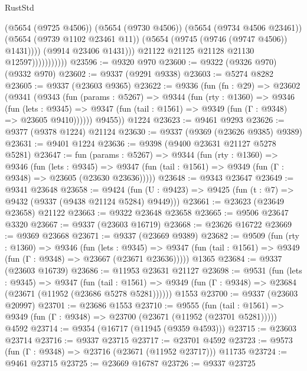 \begin{lexlean}{RustStd}
\begin{coremodule}
                                  (@5654 (@9725 @4506))
                                  (@5654 (@9730 @4506))
                                  (@5654 (@9734 @4506 @23461))
                                  (@5654 (@9739 @1102 @23461 @11))
                                  (@5654 (@9745 (@9746 (@9747 @4506)) @1431))))
                              (@9914 @23406 @1431)))
                          @21122
                          @21125
                          @21128
                          @21130
                          @12597)))))))))))
@23596 := @9320 @970
@23600 := @9322 (@9326 @970) (@9332 @970)
@23602 := @9337 (@9291 @9338)
@23603 := @5274 @8282
@23605 := @9337 (@23603 @9365)
@23622 := @9336
    (fun (fn : @29) =>
    @23602
      (@9341
        (@9343
          (fun (params : @5267) =>
          @9344
            (fun (rty : @1360) =>
            @9346
              (fun (lets : @9345) =>
              @9347 (fun (tail : @1561) => @9349 (fun (Γ : @9348) => @23605 @9410))))))
        @9455))
    @1224
@23623 := @9461 @9293
@23626 := @9377 (@9378 @1224) @21124
@23630 := @9337 (@9369 (@23626 @9385) @9389)
@23631 := @9401 @1224
@23636 := @9398 (@9400 @23631 @21127 @5278 @5281)
@23647 := fun (params : @5267) =>
  @9344
    (fun (rty : @1360) =>
    @9346
      (fun (lets : @9345) =>
      @9347 (fun (tail : @1561) => @9349 (fun (Γ : @9348) => @23605 (@23630 @23636)))))
@23648 := @9343 @23647
@23649 := @9341 @23648
@23658 := @9424
    (fun (U : @9423) => @9425 (fun (t : @7) => @9432 (@9337 (@9438 @21124 @5284) @9449)))
@23661 := @23623 (@23649 @23658) @21122
@23663 := @9322 @23648 @23658
@23665 := @9506 @23647 @3320
@23667 := @9337 (@23603 @16719)
@23668 := @23626 @16722
@23669 := @9369 @23668
@23671 := @9337 (@23669 @9389)
@23682 := @9509
    (fun (rty : @1360) =>
    @9346
      (fun (lets : @9345) =>
      @9347 (fun (tail : @1561) => @9349 (fun (Γ : @9348) => @23667 (@23671 @23636)))))
    @1365
@23684 := @9337 (@23603 @16739)
@23686 := @11953 @23631 @21127
@23698 := @9531
    (fun (lets : @9345) =>
    @9347
      (fun (tail : @1561) =>
      @9349 (fun (Γ : @9348) => @23684 (@23671 (@11952 (@23686 @5278 @5281))))))
    @1553
@23700 := @9337 (@23603 @20997)
@23701 := @23686 @1553
@23710 := @9555
    (fun (tail : @1561) => @9349 (fun (Γ : @9348) => @23700 (@23671 (@11952 (@23701 @5281)))))
    @4592
@23714 := @9354 (@16717 (@11945 (@9359 @4593)))
@23715 := @23603 @23714
@23716 := @9337 @23715
@23717 := @23701 @4592
@23723 := @9573 (fun (Γ : @9348) => @23716 (@23671 (@11952 @23717))) @11735
@23724 := @9461 @23715
@23725 := @23669 @16787
@23726 := @9337 @23725

\end{coremodule}
\end{lexlean}
